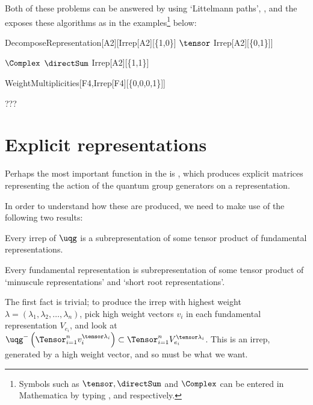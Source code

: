 Both of these problems can be answered by using `Littelmann paths',
\cite{???}, and the \pkg exposes these algorithms
as in the examples\footnote{Symbols such as $\tensor, \directSum$ and
$\Complex$ can be entered in Mathematica by typing ,
 and  respectively.} below:
\begin{mma}
\begin{inm}
DecomposeRepresentation[A2][Irrep[A2][\{1,0\}] $\tensor$
Irrep[A2][\{0,1\}]]
\end{inm}
\begin{outm}
$\Complex$ $\directSum$ Irrep[A2][\{1,1\}]
\end{outm}
\begin{inm}
WeightMultiplicities[F4,Irrep[F4][\{0,0,0,1\}]]
\end{inm}
\begin{outm}
???
\end{outm}
\end{mma}

\section{Explicit representations}
Perhaps the most important function in the \pkg is
, which produces explicit matrices representing
the action of the quantum group generators on a representation.

In order to understand how these are produced, we need to make use of the
following two results:

\begin{fact}
\label{fact:fundamental}
Every irrep of $\uqg$ is a subrepresentation of some tensor product
of fundamental representations.
\end{fact}

\begin{fact}
\label{fact:generators}
Every fundamental representation is subrepresentation of some
tensor product of `minuscule representations' and `short root
representations'.
\end{fact}

The first fact is trivial; to produce the irrep with highest weight
$\lambda = (\lambda_1, \lambda_2, \ldots, \lambda_n)$, pick high weight
vectors $v_i$ in each fundamental representation $V_{e_i}$, and look at
$\uqg^-\left(\Tensor_{i=1}^n  v_i^{\tensor \lambda_i}\right) \subset
\Tensor_{i=1}^n  V_{e_i}^{\tensor \lambda_i}$. This is an irrep,
generated by a high weight vector, and so must be what we want.

